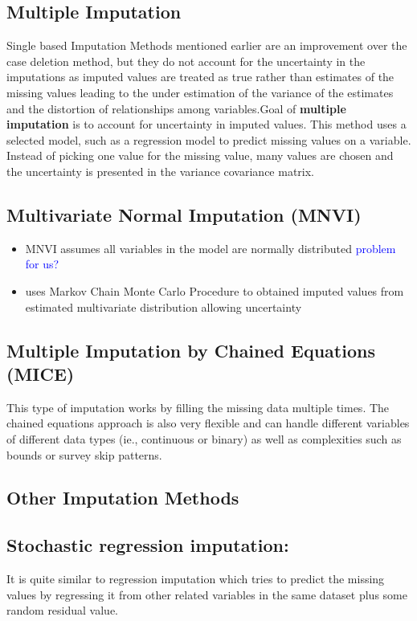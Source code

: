 \documentclass{article}
\begin{document}
\subsection*{Multiple Imputation}
Single based Imputation Methods mentioned earlier are an improvement over the case deletion method, but they do not account for the uncertainty in the imputations as imputed values are treated as true rather than estimates of the missing values leading to the under estimation of the variance of the estimates and the distortion of relationships among variables.Goal of \textbf{multiple imputation} is to account for uncertainty in imputed values. This method uses a selected model, such as a regression model to predict missing values on a variable. Instead of picking one value for the missing value, many values are chosen and the uncertainty is presented in the variance covariance matrix.

\subsection{Multivariate Normal Imputation (MNVI)}
\begin{itemize}
\item MNVI assumes all variables in the model are normally distributed \textcolor{blue}{problem for us?}
\item uses Markov Chain Monte Carlo Procedure to obtained imputed values from estimated multivariate distribution allowing uncertainty
\end{itemize}

\subsection{Multiple Imputation by Chained Equations (MICE)}
This type of imputation works by filling the missing data multiple times. The chained equations approach is also very flexible and can handle different variables of different data types (ie., continuous or binary) as well as complexities such as bounds or survey skip patterns. 

\subsection*{Other Imputation Methods}
\subsection{Stochastic regression imputation:}
It is quite similar to regression imputation which tries to predict the missing values by regressing it from other related variables in the same dataset plus some random residual value.
\end{document}
